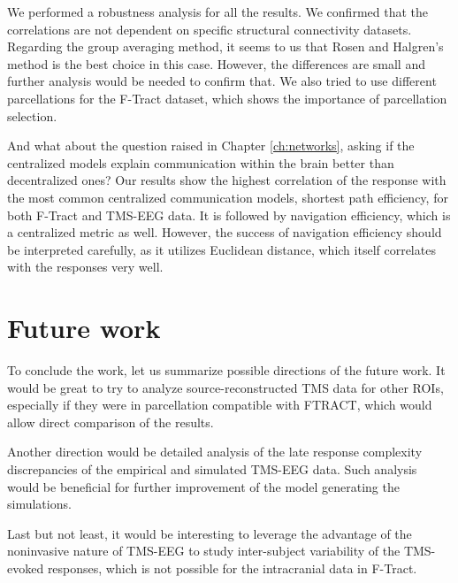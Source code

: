 We performed a robustness analysis for all the results. We confirmed that the correlations are not dependent on specific structural connectivity datasets. Regarding the group averaging method, it seems to us that Rosen and Halgren's method is the best choice in this case. However, the differences are small and further analysis would be needed to confirm that. We also tried to use different parcellations for the F-Tract dataset, which shows the importance of parcellation selection.

And what about the question raised in Chapter \ref{ch:networks}, asking if the centralized models explain communication within the brain better than decentralized ones? Our results show the highest correlation of the response with the most common centralized communication models, shortest path efficiency, for both F-Tract and TMS-EEG data. It is followed by navigation efficiency, which is a centralized metric as well. However, the success of navigation efficiency should be interpreted carefully, as it utilizes Euclidean distance, which itself correlates with the responses very well.

\section*{Future work}

To conclude the work, let us summarize possible directions of the future work. It would be great to try to analyze source-reconstructed TMS data for other ROIs, especially if they were in parcellation compatible with FTRACT, which would allow direct comparison of the results.

Another direction would be detailed analysis of the late response complexity discrepancies of the empirical and simulated TMS-EEG data. Such analysis would be beneficial for further improvement of the model generating the simulations.

Last but not least, it would be interesting to leverage the advantage of the noninvasive nature of TMS-EEG to study inter-subject variability of the TMS-evoked responses, which is not possible for the intracranial data in F-Tract.